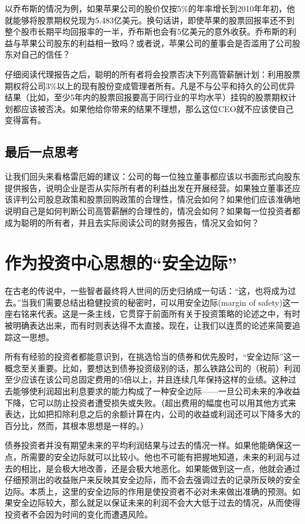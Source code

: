 \documentclass[12pt,oneside]{book}
\begin{document}
以乔布斯的情况为例，如果苹果公司的股价仅按5\%的年率增长到2010年年初，他就能够将股票期权兑现为5.483亿美元。换句话讲，即使苹果的股票回报率还不到整个股市长期平均回报率的一半，乔布斯也会有5亿美元的意外收获。乔布斯的利益与苹果公司股东的利益相一致吗？或者说，苹果公司的董事会是否滥用了公司股东对自己的信任？

仔细阅读代理报告之后，聪明的所有者将会投票否决下列高管薪酬计划：利用股票期权将公司3\%以上的现有股份变成管理者所有。凡是不与公平和持久的公司优异结果（比如，至少5年内的股票回报要高于同行业的平均水平）挂钩的股票期权计划都应该被否决。如果他给你带来的结果不理想，那么这位CEO就不应该使自己变得富有。

\subsection{最后一点思考}
让我们回头来看格雷厄姆的建议：公司的每一位独立董事都应该以书面形式向股东提供报告，说明企业是否从实际所有者的利益出发在开展经营。如果独立董事还应该评判公司股息政策和股票回购政策的合理性，情况会如何？如果他们应该准确地说明自己是如何判断公司高管薪酬的合理性的，情况会如何？如果每一位投资者都成为聪明的所有者，并且去实际阅读公司的财务报告，情况又会如何？



\section{作为投资中心思想的“安全边际”}
在古老的传说中，一些智者最终将人世间的历史归纳成一句话：“这，也将成为过去。”当我们需要总结出稳健投资的秘密时，可以用安全边际(margin of safety)这一座右铭来代表。这是一条主线，它贯穿于前面所有关于投资策略的论述之中，有时被明确表达出来，而有时则表达得不太直接。现在，让我们以连贯的论述来简要追踪这一思想。

所有有经验的投资者都能意识到，在挑选恰当的债券和优先股时，“安全边际”这一概念至关重要。比如，要想达到债券投资级别的话，那么铁路公司的（税前）利润至少应该在该公司总固定费用的5倍以上，并且连续几年保持这样的业绩。这种过去能够使利润超出利息要求的能力构成了一种安全边际——一旦公司未来的净收益下降，它可以防止投资者遭受损失或失败。（超出费用的幅度也可以用其他方式来表达，比如把扣除利息之后的余额计算在内，公司的收益或利润还可以下降多大的百分比，然而，其根本思想是一样的。）

债券投资者并没有期望未来的平均利润结果与过去的情况一样。如果他能确保这一点，所需要的安全边际就可以比较小。他也不可能有把握地知道，未来的利润与过去的相比，是会极大地改善，还是会极大地恶化。如果能做到这一点，他就会通过仔细预测出的收益账户来反映其安全边际，而不会去强调过去的记录所反映的安全边际。本质上，这里的安全边际的作用是使投资者不必对未来做出准确的预测。如果安全边际较大，那么就足以保证未来的利润不会大大低于过去的情况，从而使得投资者不会因为时间的变化而遭遇风险。
\end{document}
